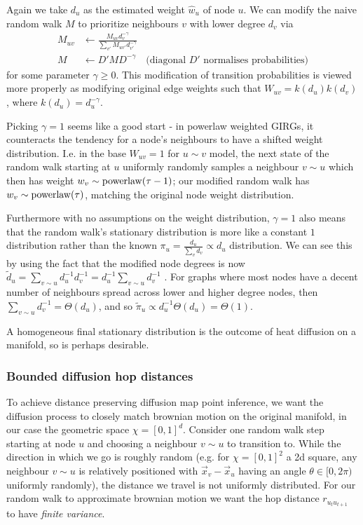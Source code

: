 Again we take $d_u$ as the estimated weight $\hat{w}_u$ of node $u$. 
We can modify the naive random walk $M$ to prioritize neighbours $v$ with lower degree $d_v$ via
\begin{align*}
  M_{uv} &\gets \frac{M_{uv} {d_v^{-\gamma}}}{\sum_{v'} M_{uv'} {d_{v'}^{-\gamma}}}
  \\
  M &\gets D' M D^{-\gamma} \quad \text{(diagonal $D'$ normalises probabilities)}
\end{align*}
for some parameter $\gamma \geq 0$. This modification of transition probabilities is viewed more properly as modifying original edge weights such that $W_{uv} = k(d_u) k(d_v)$, where $k(d_u) = d_u^{-\gamma}$.


Picking $\gamma=1$ seems like a good start - in powerlaw weighted GIRGs, it counteracts the tendency for a node's neighbours to have a shifted weight distribution. I.e. in the base $W_{uv} = 1$ for $u \sim v$  model, the next state of the random walk starting at $u$ uniformly randomly samples a neighbour $v \sim u$ which then has weight $w_v \sim \operatorname{powerlaw}(\tau - 1)$; our modified random walk has $w_v \sim \operatorname{powerlaw}(\tau)$, matching the original node weight distribution. 

Furthermore with no assumptions on the weight distribution, $\gamma=1$ also means that the random walk's stationary distribution is more like a constant $1$ distribution rather than the known $\pi_u = \frac{d_u}{\sum_v d_v} \propto d_u$ distribution.
We can see this by using the fact that the modified node degrees is now $\tilde{d}_u = \sum_{v \sim u} d_u^{-1} d_v^{-1} = d_u^{-1} \sum_{v \sim u} d_v^{-1}$
.
For graphs where most nodes have a decent number of neighbours spread across lower and higher degree nodes, then $\sum_{v \sim u} d_v^{-1} = \Theta(d_u)$, and so $\tilde{\pi}_u \propto d_u^{-1} \Theta(d_u) = \Theta(1)$.

A homogeneous final stationary distribution is the outcome of heat diffusion on a manifold, so is perhaps desirable.


\subsubsection{Bounded diffusion hop distances}
To achieve distance preserving diffusion map point inference, we want the diffusion process to closely match brownian motion on the original manifold, in our case the geometric space $\chi = [0,1]^d$. Consider one random walk step starting at node $u$ and choosing a neighbour $v \sim u$ to transition to. While the direction in which we go is roughly random (e.g. for $\chi=[0,1]^2$ a 2d square, any neighbour $v \sim u$ is relatively positioned with $\vec{x}_v - \vec{x}_u$ having an angle $\theta \in [0, 2\pi)$ uniformly randomly), the distance we travel is not uniformly distributed. For our random walk to approximate brownian motion we want the hop distance $r_{u_t u_{t+1}}$ to have \textit{finite variance}. 

